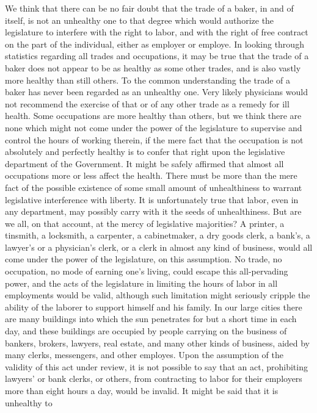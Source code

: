 \documentclass[
  letterpaper,
  11pt,
  DIV=9,
  openright]{scrbook}
\begin{document}
We think that there can be no fair doubt that the trade of a baker, in
and of itself, is not an unhealthy one to that degree which would
authorize the legislature to interfere with the right to labor, and with
the right of free contract on the part of the individual, either as
employer or employe. In looking through statistics regarding all trades
and occupations, it may be true that the trade of a baker does not
appear to be as healthy as some other trades, and is also vastly more
healthy than still others. To the common understanding the trade of a
baker has never been regarded as an unhealthy one. Very likely
physicians would not recommend the exercise of that or of any other
trade as a remedy for ill health. Some occupations are more healthy than
others, but we think there are none which might not come under the power
of the legislature to supervise and control the hours of working
therein, if the mere fact that the occupation is not absolutely and
perfectly healthy is to confer that right upon the legislative
department of the Government. It might be safely affirmed that almost
all occupations more or less affect the health. There must be more than
the mere fact of the possible existence of some small amount of
unhealthiness to warrant legislative interference with liberty. It is
unfortunately true that labor, even in any department, may possibly
carry with it the seeds of unhealthiness. But are we all, on that
account, at the mercy of legislative majorities? A printer, a tinsmith,
a locksmith, a carpenter, a cabinetmaker, a dry goods clerk, a bank's, a
lawyer's or a physician's clerk, or a clerk in almost any kind of
business, would all come under the power of the legislature, on this
assumption. No trade, no occupation, no mode of earning one's living,
could escape this all-pervading power, and the acts of the legislature
in limiting the hours of labor in all employments would be valid,
although such limitation might seriously cripple the ability of the
laborer to support himself and his family. In our large cities there are
many buildings into which the sun penetrates for but a short time in
each day, and these buildings are occupied by people carrying on the
business of bankers, brokers, lawyers, real estate, and many other kinds
of business, aided by many clerks, messengers, and other employes. Upon
the assumption of the validity of this act under review, it is not
possible to say that an act, prohibiting lawyers' or bank clerks, or
others, from contracting to labor for their employers more than eight
hours a day, would be invalid. It might be said that it is unhealthy to
\end{document}
